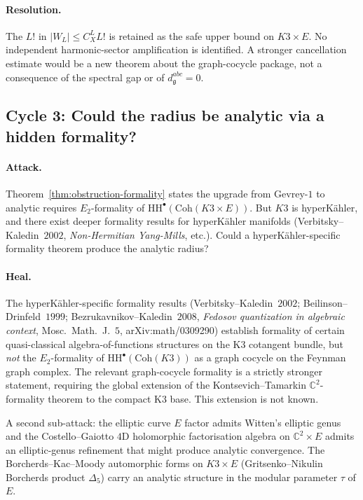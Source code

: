 \documentclass[11pt]{article}
\providecommand{\frakg}{\mathfrak{g}}
\providecommand{\HH}{\mathrm{HH}}
\providecommand{\C}{\mathbb{C}}
\providecommand{\Coh}{\mathrm{Coh}}
\theoremstyle{definition}\newtheorem{definition}[theorem]{Definition}
\theoremstyle{remark}\newtheorem{remark}[theorem]{Remark}\newtheorem{example}[theorem]{Example}
\begin{document}
\paragraph{Resolution.}
The $L!$ in $|W_L|\leq C_X^L L!$ is retained as the safe upper bound
on $K3\times E$. No independent harmonic-sector amplification is
identified. A stronger cancellation estimate would be a new theorem
about the graph-cocycle package, not a consequence of the spectral
gap or of $d^{abc}_\frakg=0$.

\subsection{Cycle 3: Could the radius be analytic via a hidden formality?}

\paragraph{Attack.}
Theorem~\ref{thm:obstruction-formality} states the upgrade from
Gevrey-$1$ to analytic requires $E_2$-formality of
$\HH^\bullet(\Coh(K3\times E))$. But $K3$ is hyperK\"ahler, and there
exist deeper formality results for hyperK\"ahler manifolds
(Verbitsky--Kaledin~$2002$, \emph{Non-Hermitian Yang-Mills}, etc.).
Could a hyperK\"ahler-specific formality theorem produce the analytic
radius?

\paragraph{Heal.}
The hyperK\"ahler-specific formality results
(Verbitsky--Kaledin~$2002$; Beilinson--Drinfeld~$1999$; Bezrukavnikov--Kaledin~$2008$,
\emph{Fedosov quantization in algebraic context}, Mosc.~Math.~J.~$5$,
arXiv:math/0309290) establish formality of certain quasi-classical
algebra-of-functions structures on the K3 cotangent bundle, but
\emph{not} the $E_2$-formality of $\HH^\bullet(\Coh(K3))$ as a graph
cocycle on the Feynman graph complex. The relevant graph-cocycle
formality is a strictly stronger statement, requiring the global
extension of the Kontsevich--Tamarkin $\C^2$-formality theorem to the
compact K3 base. This extension is not known.

A second sub-attack: the elliptic curve $E$ factor admits Witten's
elliptic genus and the Costello--Gaiotto $4$D holomorphic factorisation
algebra on $\C^2\times E$ admits an elliptic-genus refinement that
might produce analytic convergence. The Borcherds--Kac--Moody automorphic
forms on $K3\times E$ (Gritsenko--Nikulin Borcherds product
$\Delta_5$) carry an analytic structure in the modular parameter $\tau$
of $E$.
\end{document}
